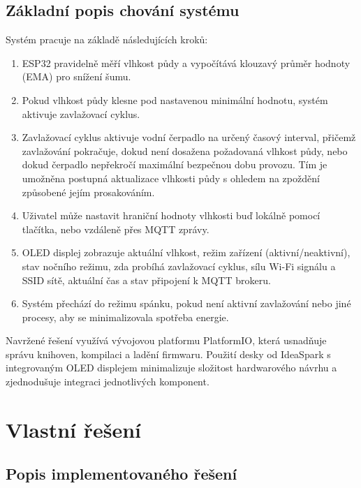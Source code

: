 \documentclass[a4paper, 11pt]{article}
\begin{document}
\subsection{Základní popis chování systému}

Systém pracuje na základě následujících kroků:
\begin{enumerate}
    \item ESP32 pravidelně měří vlhkost půdy a vypočítává klouzavý průměr hodnoty (EMA) pro snížení šumu.
    \item Pokud vlhkost půdy klesne pod nastavenou minimální hodnotu, systém aktivuje zavlažovací cyklus.
    \item Zavlažovací cyklus aktivuje vodní čerpadlo na určený časový interval, přičemž zavlažování pokračuje, dokud není dosažena požadovaná vlhkost půdy, nebo dokud čerpadlo nepřekročí maximální bezpečnou dobu provozu. Tím je umožněna postupná aktualizace vlhkosti půdy s ohledem na zpoždění způsobené jejím prosakováním.
    \item Uživatel může nastavit hraniční hodnoty vlhkosti buď lokálně pomocí tlačítka, nebo vzdáleně přes MQTT zprávy.
    \item OLED displej zobrazuje aktuální vlhkost, režim zařízení (aktivní/neaktivní), stav nočního režimu, zda probíhá zavlažovací cyklus, sílu Wi-Fi signálu a SSID sítě, aktuální čas a stav připojení k MQTT brokeru. 
    \item Systém přechází do režimu spánku, pokud není aktivní zavlažování nebo jiné procesy, aby se minimalizovala spotřeba energie.
\end{enumerate}

Navržené řešení využívá vývojovou platformu PlatformIO, která usnadňuje správu knihoven, kompilaci a ladění firmwaru. 
Použití desky od IdeaSpark s integrovaným OLED displejem minimalizuje složitost hardwarového návrhu a zjednodušuje integraci jednotlivých komponent.

\section{Vlastní řešení}

\subsection{Popis implementovaného řešení}
\end{document}

